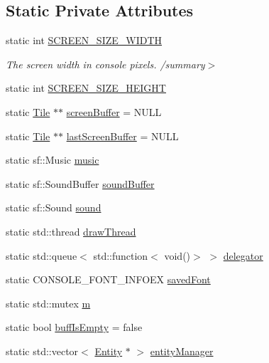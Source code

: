 \subsection*{Static Private Attributes}
\begin{DoxyCompactItemize}
\item 
static int \hyperlink{classrl_util_j_m_afefcc8459829f1dd722fa8ba2a00de7e}{S\+C\+R\+E\+E\+N\+\_\+\+S\+I\+Z\+E\+\_\+\+W\+I\+D\+TH}
\begin{DoxyCompactList}\small\item\em The screen width in console pixels. /summary$>$ \end{DoxyCompactList}\item 
static int \hyperlink{classrl_util_j_m_abf6bb47334fc17dfda072430c6fe6d56}{S\+C\+R\+E\+E\+N\+\_\+\+S\+I\+Z\+E\+\_\+\+H\+E\+I\+G\+HT}
\item 
static \hyperlink{class_tile}{Tile} $\ast$$\ast$ \hyperlink{classrl_util_j_m_aeb7bf36dcf28128f978568053552e4f5}{screen\+Buffer} = N\+U\+LL
\item 
static \hyperlink{class_tile}{Tile} $\ast$$\ast$ \hyperlink{classrl_util_j_m_a59c68887fde5d301a6f6520049a622d8}{last\+Screen\+Buffer} = N\+U\+LL
\item 
static sf\+::\+Music \hyperlink{classrl_util_j_m_af674b0f94fe8beb836cb2d416109e52c}{music}
\item 
static sf\+::\+Sound\+Buffer \hyperlink{classrl_util_j_m_a624fabc30e3d76c5a32dadca5ea1186d}{sound\+Buffer}
\item 
static sf\+::\+Sound \hyperlink{classrl_util_j_m_a9657abcb8f9ebba2f246e5ffc86c920d}{sound}
\item 
static std\+::thread \hyperlink{classrl_util_j_m_a4ea8d5da372d2fee4641e0bddcdb9133}{draw\+Thread}
\item 
static std\+::queue$<$ std\+::function$<$ void()$>$ $>$ \hyperlink{classrl_util_j_m_a1df970acbe44fac6cb97d745919b23a9}{delegator}
\item 
static C\+O\+N\+S\+O\+L\+E\+\_\+\+F\+O\+N\+T\+\_\+\+I\+N\+F\+O\+EX \hyperlink{classrl_util_j_m_af5fa1b868595501a74efe2d3df096967}{saved\+Font}
\item 
static std\+::mutex \hyperlink{classrl_util_j_m_a1a8bbd1ef16d9c99251e5a43cc5000fc}{m}
\item 
static bool \hyperlink{classrl_util_j_m_ae190159bd0ef09b7052d7bb21c5a32fb}{buff\+Is\+Empty} = false
\item 
static std\+::vector$<$ \hyperlink{class_entity}{Entity} $\ast$ $>$ \hyperlink{classrl_util_j_m_a295dbb06816363aeec0c42b1435d56cb}{entity\+Manager}

\end{DoxyCompactItemize}

